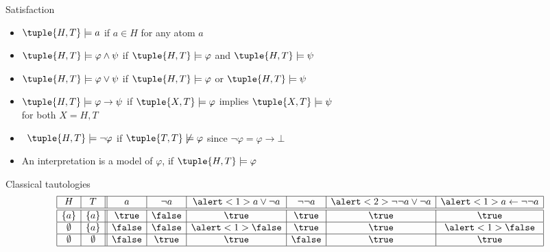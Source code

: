 \begin{frame}{Satisfaction}
  \begin{itemize}
  \item $\tuple{H,T} \models a$ if $a \in H$ \hfill for any atom $a$
  \item $\tuple{H,T} \models \varphi \wedge \psi$ if
    $\tuple{H,T} \models \varphi$
    and
    $\tuple{H,T} \models \psi$
  \item $\tuple{H,T} \models \varphi \vee \psi$ if
    $\tuple{H,T} \models \varphi$
    or
    $\tuple{H,T} \models \psi$

    \smallskip

  \item<2-> $\tuple{H,T} \models \varphi \rightarrow \psi$ if
    $\tuple{X,T} \models \varphi$ implies $\tuple{X,T} \models \psi$
    \\\qquad\qquad
    for both $X=H,T$

    \bigskip

  \item<3>  \ $\tuple{H,T} \models \neg\varphi$ if $\tuple{T,T} \not\models \varphi$
    \hfill since $\neg\varphi = \varphi\to\bot$

    \bigskip

  \item<4-> An interpretation  is a \alert{model} of $\varphi$, if $\tuple{H,T} \models \varphi$
  \end{itemize}
\end{frame}
\begin{frame}{Classical tautologies}
  \centering
  \bigskip
  \[
    \begin{array}{| c | c || c | c | c | c | c | c |}
      \hline
      H         & T          & a      & \neg a & \alert<1>{a \vee \neg a} & \neg\neg a & \alert<2>{\neg\neg a \vee \neg a} & \alert<1>{a \leftarrow \neg\neg a}
      \\\hline\hline
      \{ a \}   & \{ a \}    & \true  & \false & \true                    & \true      & \true                             & \true
      \\\hline
      \emptyset & \{ a \}    & \false & \false & \alert<1>{\false}        & \true      & \true                             & \alert<1>{\false}
      \\\hline
      \emptyset & \emptyset  & \false & \true  & \true                    & \false     & \true                             & \true
      \\\hline
    \end{array}
  \]
\end{frame}
